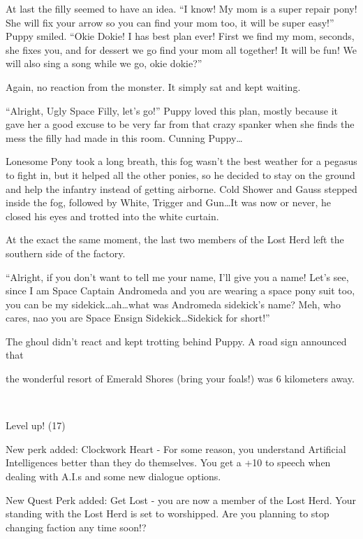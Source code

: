 At last the filly seemed to have an idea. ``I know! My mom is a super repair pony! She will fix your arrow so you can find your mom too, it will be super easy!'' Puppy smiled. ``Okie Dokie! I has best plan ever! First we find my mom, seconds, she fixes you, and for dessert we go find your mom all together! It will be fun! We will also sing a song while we go, okie dokie?''

Again, no reaction from the monster. It simply sat and kept waiting.

``Alright, Ugly Space Filly, let's go!'' Puppy loved this plan, mostly because it gave her a good excuse to be very far from that crazy spanker when she finds the mess the filly had made in this room. Cunning Puppy\dots

\horizonline


Lonesome Pony took a long breath, this fog wasn't the best weather for a pegasus to fight in, but it helped all the other ponies, so he decided to stay on the ground and help the infantry instead of getting airborne. Cold Shower and Gauss stepped inside the fog, followed by White, Trigger and Gun\dots It was now or never, he closed his eyes and trotted into the white curtain.

At the exact the same moment, the last two members of the Lost Herd left the southern side of the factory.

``Alright, if you don't want to tell me your name, I'll give you a name! Let's see, since I am Space Captain Andromeda and you are wearing a space pony suit too, you can be my sidekick\dots ah\dots what was Andromeda sidekick's name? Meh, who cares, nao you are Space Ensign Sidekick\dots Sidekick for short!''

The ghoul didn't react and kept trotting behind Puppy. A road sign announced that 

\begin{center}
    the wonderful resort of Emerald Shores (bring your foals!) was 6 kilometers away.
\end{center}

~\vfill

\begin{engnote}
    Level up! (17)
    
    New perk added: Clockwork Heart - For some reason, you understand Artificial Intelligences better than they do themselves. You get a +10 to speech when dealing with A.I.s and some new dialogue options.
    
    New Quest Perk added: Get Lost - you are now a member of the Lost Herd. Your standing with the Lost Herd is set to worshipped. Are you planning to stop changing faction any time soon!?
\end{engnote}


